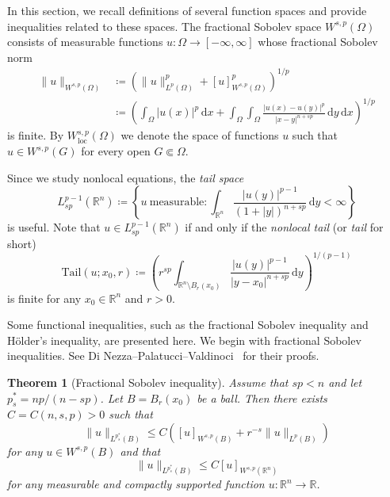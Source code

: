 \documentclass[11pt]{amsart}
\theoremstyle{plain}
\newtheorem{theorem}{Theorem}[section]
\theoremstyle{definition}
\numberwithin{equation}{section}
\begin{document}
In this section, we recall definitions of several function spaces and provide inequalities related to these spaces. The fractional Sobolev space $W^{s, p}(\Omega)$ consists of measurable functions $u: \Omega \to [-\infty, \infty]$ whose fractional Sobolev norm
\begin{align*}
\|u\|_{W^{s, p}(\Omega)}
&\coloneqq \left( \|u\|_{L^p(\Omega)}^p + [u]_{W^{s, p}(\Omega)}^p \right)^{1/p} \\
&\coloneqq \left( \int_\Omega |u(x)|^p \,\mathrm{d}x + \int_\Omega \int_\Omega \frac{|u(x)-u(y)|^p}{|x-y|^{n+sp}} \,\mathrm{d}y\,\mathrm{d}x \right)^{1/p}
\end{align*}
is finite. By $W^{s, p}_{\mathrm{loc}}(\Omega)$ we denote the space of functions $u$ such that $u \in W^{s, p}(G)$ for every open $G \Subset \Omega$.

Since we study nonlocal equations, the \emph{tail space}
\begin{equation*}
L^{p-1}_{sp}(\mathbb{R}^n) \coloneqq \left\{ u~\text{measurable}: \int_{\mathbb{R}^n} \frac{|u(y)|^{p-1}}{(1+|y|)^{n+sp}} \,\mathrm{d}y < \infty \right\}
\end{equation*}
is useful. Note that $u \in L^{p-1}_{sp}(\mathbb{R}^n)$ if and only if the \emph{nonlocal tail} (or \emph{tail} for short)
\begin{equation*}
\mathrm{Tail}(u; x_0, r) \coloneqq \left( r^{sp} \int_{\mathbb{R}^n \setminus B_r(x_0)} \frac{|u(y)|^{p-1}}{|y-x_0|^{n+sp}} \,\mathrm{d}y \right)^{1/(p-1)}
\end{equation*}
is finite for any $x_0 \in \mathbb{R}^n$ and $r>0$.


Some functional inequalities, such as the fractional Sobolev inequality and H\"older's inequality, are presented here. We begin with fractional Sobolev inequalities. See Di Nezza--Palatucci--Valdinoci~\cite[Theorems~6.5~and~6.7]{DNPV12} for their proofs.

\begin{theorem}[Fractional Sobolev inequality]
\label{thm-Sobolev}
Assume that $sp<n$ and let $p^{\ast}_s = np/(n-sp)$. Let $B=B_r(x_0)$ be a ball. Then there exists $C=C(n, s, p)>0$ such that
\begin{equation*}
\|u\|_{L^{p^{\ast}_s}(B)} \leq C \left( [u]_{W^{s, p}(B)} + r^{-s} \|u\|_{L^p(B)} \right)
\end{equation*}
for any $u \in W^{s, p}(B)$ and that
\begin{equation*}
\|u\|_{L^{p^{\ast}_s}(B)} \leq C [u]_{W^{s, p}(\mathbb{R}^n)}
\end{equation*}
for any measurable and compactly supported function $u:\mathbb{R}^n \to \mathbb{R}$.
\end{theorem}
\end{document}
